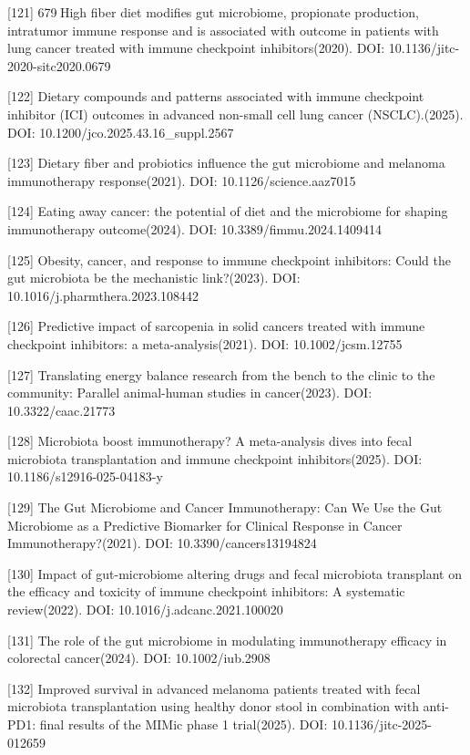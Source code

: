 {[}121{]} 679 High fiber diet modifies gut microbiome, propionate production, intratumor immune response and is associated with outcome in patients with lung cancer treated with immune checkpoint inhibitors(2020). DOI: 10.1136/jitc-2020-sitc2020.0679

{[}122{]} Dietary compounds and patterns associated with immune checkpoint inhibitor (ICI) outcomes in advanced non-small cell lung cancer (NSCLC).(2025). DOI: 10.1200/jco.2025.43.16\_suppl.2567

{[}123{]} Dietary fiber and probiotics influence the gut microbiome and melanoma immunotherapy response(2021). DOI: 10.1126/science.aaz7015

{[}124{]} Eating away cancer: the potential of diet and the microbiome for shaping immunotherapy outcome(2024). DOI: 10.3389/fimmu.2024.1409414

{[}125{]} Obesity, cancer, and response to immune checkpoint inhibitors: Could the gut microbiota be the mechanistic link?(2023). DOI: 10.1016/j.pharmthera.2023.108442

{[}126{]} Predictive impact of sarcopenia in solid cancers treated with immune checkpoint inhibitors: a meta-analysis(2021). DOI: 10.1002/jcsm.12755

{[}127{]} Translating energy balance research from the bench to the clinic to the community: Parallel animal-human studies in cancer(2023). DOI: 10.3322/caac.21773

{[}128{]} Microbiota boost immunotherapy? A meta-analysis dives into fecal microbiota transplantation and immune checkpoint inhibitors(2025). DOI: 10.1186/s12916-025-04183-y

{[}129{]} The Gut Microbiome and Cancer Immunotherapy: Can We Use the Gut Microbiome as a Predictive Biomarker for Clinical Response in Cancer Immunotherapy?(2021). DOI: 10.3390/cancers13194824

{[}130{]} Impact of gut-microbiome altering drugs and fecal microbiota transplant on the efficacy and toxicity of immune checkpoint inhibitors: A systematic review(2022). DOI: 10.1016/j.adcanc.2021.100020

{[}131{]} The role of the gut microbiome in modulating immunotherapy efficacy in colorectal cancer(2024). DOI: 10.1002/iub.2908

{[}132{]} Improved survival in advanced melanoma patients treated with fecal microbiota transplantation using healthy donor stool in combination with anti-PD1: final results of the MIMic phase 1 trial(2025). DOI: 10.1136/jitc-2025-012659

